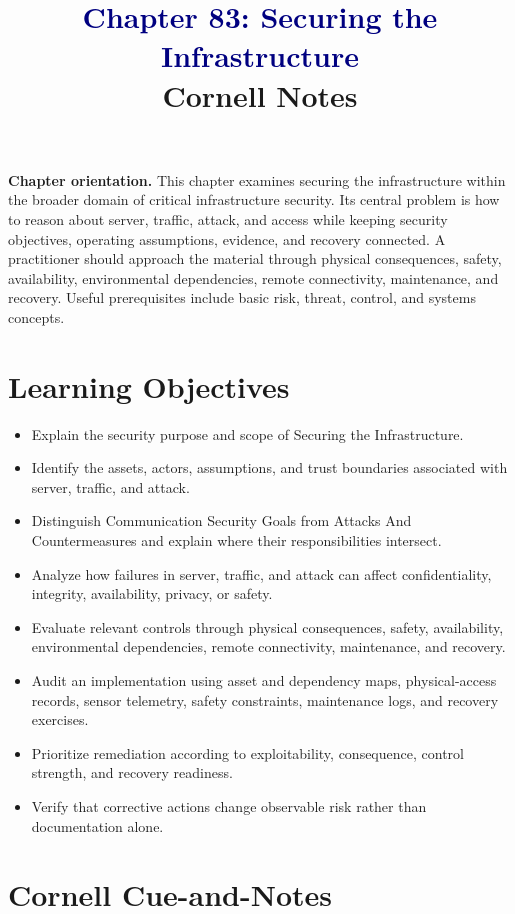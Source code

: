 \documentclass[11pt]{article}
\title{\textcolor{Navy}{Chapter 83: Securing the Infrastructure}\\[2mm]\large Cornell Notes}
\author{}
\date{}
\begin{document}
\maketitle
\thispagestyle{fancy}
\vspace{-1.5em}
\begin{orientationbox}
\textbf{Chapter orientation.} This chapter examines securing the infrastructure within the broader domain of critical infrastructure security. Its central problem is how to reason about server, traffic, attack, and access while keeping security objectives, operating assumptions, evidence, and recovery connected. A practitioner should approach the material through physical consequences, safety, availability, environmental dependencies, remote connectivity, maintenance, and recovery. Useful prerequisites include basic risk, threat, control, and systems concepts.
\end{orientationbox}
\section*{Learning Objectives}
\begin{itemize}
\item Explain the security purpose and scope of Securing the Infrastructure.
\item Identify the assets, actors, assumptions, and trust boundaries associated with server, traffic, and attack.
\item Distinguish Communication Security Goals from Attacks And Countermeasures and explain where their responsibilities intersect.
\item Analyze how failures in server, traffic, and attack can affect confidentiality, integrity, availability, privacy, or safety.
\item Evaluate relevant controls through physical consequences, safety, availability, environmental dependencies, remote connectivity, maintenance, and recovery.
\item Audit an implementation using asset and dependency maps, physical-access records, sensor telemetry, safety constraints, maintenance logs, and recovery exercises.
\item Prioritize remediation according to exploitability, consequence, control strength, and recovery readiness.
\item Verify that corrective actions change observable risk rather than documentation alone.
\end{itemize}
\section*{Cornell Cue-and-Notes}
\end{document}
